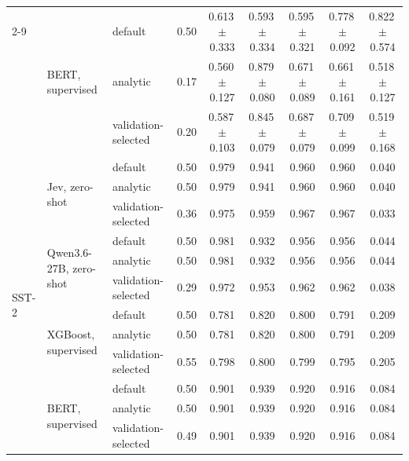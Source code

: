 \begin{tabular}{lllcccccc}
\cmidrule(lr){2-9}
 & \multirow{3}{*}{BERT, supervised} & default & 0.50 & 0.613\,{\scriptsize$\pm$0.333} & 0.593\,{\scriptsize$\pm$0.334} & 0.595\,{\scriptsize$\pm$0.321} & 0.778\,{\scriptsize$\pm$0.092} & 0.822\,{\scriptsize$\pm$0.574} \\
 &  & analytic & 0.17 & 0.560\,{\scriptsize$\pm$0.127} & 0.879\,{\scriptsize$\pm$0.080} & 0.671\,{\scriptsize$\pm$0.089} & 0.661\,{\scriptsize$\pm$0.161} & 0.518\,{\scriptsize$\pm$0.127} \\
 &  & validation-selected & 0.20 & 0.587\,{\scriptsize$\pm$0.103} & 0.845\,{\scriptsize$\pm$0.079} & 0.687\,{\scriptsize$\pm$0.079} & 0.709\,{\scriptsize$\pm$0.099} & 0.519\,{\scriptsize$\pm$0.168} \\
\midrule
\multirow{12}{*}{SST-2} & \multirow{3}{*}{Jev, zero-shot} & default & 0.50 & 0.979 & 0.941 & 0.960 & 0.960 & 0.040 \\
 &  & analytic & 0.50 & 0.979 & 0.941 & 0.960 & 0.960 & 0.040 \\
 &  & validation-selected & 0.36 & 0.975 & 0.959 & 0.967 & 0.967 & 0.033 \\
\cmidrule(lr){2-9}
 & \multirow{3}{*}{Qwen3.6-27B, zero-shot} & default & 0.50 & 0.981 & 0.932 & 0.956 & 0.956 & 0.044 \\
 &  & analytic & 0.50 & 0.981 & 0.932 & 0.956 & 0.956 & 0.044 \\
 &  & validation-selected & 0.29 & 0.972 & 0.953 & 0.962 & 0.962 & 0.038 \\
\cmidrule(lr){2-9}
 & \multirow{3}{*}{XGBoost, supervised} & default & 0.50 & 0.781 & 0.820 & 0.800 & 0.791 & 0.209 \\
 &  & analytic & 0.50 & 0.781 & 0.820 & 0.800 & 0.791 & 0.209 \\
 &  & validation-selected & 0.55 & 0.798 & 0.800 & 0.799 & 0.795 & 0.205 \\
\cmidrule(lr){2-9}
 & \multirow{3}{*}{BERT, supervised} & default & 0.50 & 0.901 & 0.939 & 0.920 & 0.916 & 0.084 \\
 &  & analytic & 0.50 & 0.901 & 0.939 & 0.920 & 0.916 & 0.084 \\
 &  & validation-selected & 0.49 & 0.901 & 0.939 & 0.920 & 0.916 & 0.084 \\
\bottomrule
\end{tabular}
